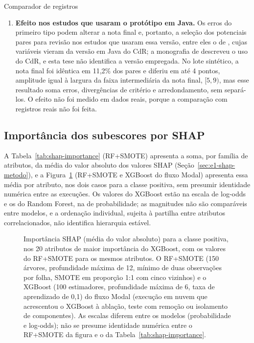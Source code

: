 \begin{chapter}{Comparador de registros}
\begin{enumerate}
\item \textbf{Efeito nos estudos que usaram o protótipo em Java.} Os erros do primeiro tipo podem alterar a nota final e, portanto, a seleção dos potenciais pares para revisão nos estudos que usaram essa versão, entre eles o de , cujas variáveis vieram da versão em Java do CdR; a monografia de  descreveu o uso do CdR, e esta tese não identifica a versão empregada. No lote sintético, a nota final foi idêntica em 11,2\% dos pares e diferiu em até 4 pontos, amplitude igual à largura da faixa intermediária da nota final, $[5,9)$, mas esse resultado soma erros, divergências de critério e arredondamento, sem separá-los. O efeito não foi medido em dados reais, porque a comparação com registros reais não foi feita.
\end{enumerate}

\subsection{Importância dos subescores por SHAP}\label{sec:e1-shap-resultados}

A Tabela~\ref{tab:shap-importance} (RF+SMOTE) apresenta a soma, por família de atributos, da média do valor absoluto dos valores SHAP (Seção~\ref{sec:e1-shap-metodo}), e a Figura~\ref{fig:shap-summary} (RF+SMOTE e XGBoost do fluxo Modal) apresenta essa média por atributo, nos dois casos para a classe positiva, sem presumir identidade numérica entre as execuções. Os valores do XGBoost estão na escala de log-odds e os do Random Forest, na de probabilidade; as magnitudes não são comparáveis entre modelos, e a ordenação individual, sujeita à partilha entre atributos correlacionados, não identifica hierarquia estável.



\begin{figure}[!ht]
\centering
\resizebox{\textwidth}{!}{}
\caption{Importância SHAP (média do valor absoluto) para a classe positiva, nos 20 atributos de maior importância do XGBoost, com os valores do RF+SMOTE para os mesmos atributos. O RF+SMOTE (150 árvores, profundidade máxima de 12, mínimo de duas observações por folha, SMOTE em proporção 1:1 com cinco vizinhos) e o XGBoost (100 estimadores, profundidade máxima de 6, taxa de aprendizado de 0,1) do fluxo Modal (execução em nuvem que acrescentou o XGBoost à ablação, teste com remoção ou isolamento de componentes). As escalas diferem entre os modelos (probabilidade e log-odds); não se presume identidade numérica entre o RF+SMOTE da figura e o da Tabela~\ref{tab:shap-importance}.}
\label{fig:shap-summary}
\end{figure}


\end{chapter}
